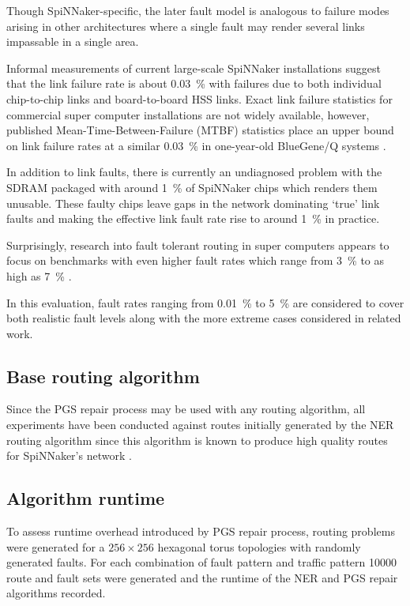 			Though SpiNNaker-specific, the later fault model is analogous to failure
			modes arising in other architectures where a single fault may render
			several links impassable in a single area.
			
			Informal measurements of current large-scale SpiNNaker installations
			suggest that the link failure rate is about \SI{0.03}{\percent} with
			failures due to both individual chip-to-chip links and board-to-board HSS
			links. Exact link failure statistics for commercial super computer
			installations are not widely available, however, published
			Mean-Time-Between-Failure (MTBF) statistics place an upper bound on link
			failure rates at a similar \SI{0.03}{\percent} in one-year-old BlueGene/Q
			systems \cite{chiu11}.
			
			In addition to link faults, there is currently an undiagnosed problem
			with the SDRAM packaged with around \SI{1}{\percent} of SpiNNaker chips
			which renders them unusable. These faulty chips leave gaps in the network
			dominating `true' link faults and making the effective link fault rate
			rise to around \SI{1}{\percent} in practice.
			
			Surprisingly, research into fault tolerant routing in super computers
			appears to focus on benchmarks with even higher fault rates which range
			from \SI{3}{\percent} to as high as \SI{7}{\percent}
			\cite{ho04,gomez04,mejia06}.
			
			In this evaluation, fault rates ranging from \SI{0.01}{\percent} to
			\SI{5}{\percent} are considered to cover both realistic fault levels
			along with the more extreme cases considered in related work.
		
		\subsection{Base routing algorithm}
			
			Since the PGS repair process may be used with any routing algorithm, all
			experiments have been conducted against routes initially generated by the
			NER routing algorithm since this algorithm is known to produce high
			quality routes for SpiNNaker's network \cite{navaridas14}.
			
		\subsection{Algorithm runtime}
			
			To assess runtime overhead introduced by PGS repair process, routing
			problems were generated for a $256\times256$ hexagonal torus topologies
			with randomly generated faults. For each combination of fault pattern and
			traffic pattern \num{10000} route and fault sets were generated and the
			runtime of the NER and PGS repair algorithms recorded.
			
